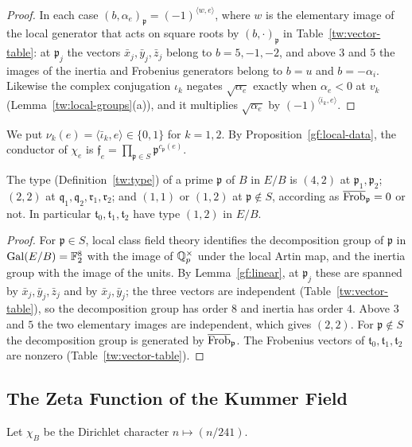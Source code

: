 \begin{proof}
In each case $(b,\alpha_e)_{\mathfrak p}=(-1)^{\langle w,e\rangle}$, where $w$
is the elementary image of the local generator that acts on square roots by
$(b,\cdot)_{\mathfrak p}$ in Table~\ref{tw:vector-table}: at $\mathfrak p_j$
the vectors $\bar x_j,\bar y_j,\bar z_j$ belong to $b=5,-1,-2$, and above
$3$ and $5$ the images of the inertia and Frobenius generators belong to
$b=u$ and $b=-\alpha_i$. Likewise the complex conjugation $\iota_k$ negates
$\sqrt{\alpha_e}$ exactly when $\alpha_e<0$ at $v_k$
(Lemma~\ref{tw:local-groups}(a)), and it multiplies $\sqrt{\alpha_e}$ by
$(-1)^{\langle\bar\iota_k,e\rangle}$.
\end{proof}

We put $\nu_k(e)=\langle\bar\iota_k,e\rangle\in\{0,1\}$ for $k=1,2$. By
Proposition~\ref{gf:local-data}, the conductor of $\chi_e$
is $\mathfrak f_e=\prod_{\mathfrak p\in S}\mathfrak p^{c_{\mathfrak p}(e)}$.

\begin{corollary}\label{gf:types}
The type (Definition~\ref{tw:type}) of a prime $\mathfrak p$ of $B$ in
$E/B$ is $(4,2)$ at $\mathfrak p_1,\mathfrak p_2$; $(2,2)$ at
$\mathfrak q_1,\mathfrak q_2,\mathfrak r_1,\mathfrak r_2$; and $(1,1)$ or
$(1,2)$ at $\mathfrak p\notin S$, according as $\overline{\operatorname{Frob}}_{\mathfrak p}=0$
or not.
In particular $\mathfrak t_0,\mathfrak t_1,\mathfrak t_2$ have type $(1,2)$
in $E/B$.
\end{corollary}

\begin{proof}
For $\mathfrak p\in S$, local class field theory identifies the
decomposition group of $\mathfrak p$ in $\operatorname{Gal}(E/B)=\mathbb F_2^8$ with the image
of $\mathbb Q_p^\times$ under the local Artin map, and the inertia group with the
image of the units. By Lemma~\ref{gf:linear}, at $\mathfrak p_j$ these are
spanned by $\bar x_j,\bar y_j,\bar z_j$ and by $\bar x_j,\bar y_j$; the three
vectors are independent (Table~\ref{tw:vector-table}), so the decomposition
group has order $8$ and inertia has order $4$. Above $3$ and $5$ the two
elementary images are independent, which gives $(2,2)$. For
$\mathfrak p\notin S$ the decomposition group is generated by
$\overline{\operatorname{Frob}}_{\mathfrak p}$. The Frobenius vectors of $\mathfrak t_0,\mathfrak
t_1,\mathfrak t_2$ are nonzero (Table~\ref{tw:vector-table}).
\end{proof}

\subsection{The Zeta Function of the Kummer Field}
Let $\chi_B$ be the Dirichlet character $n\mapsto(n/241)$.

